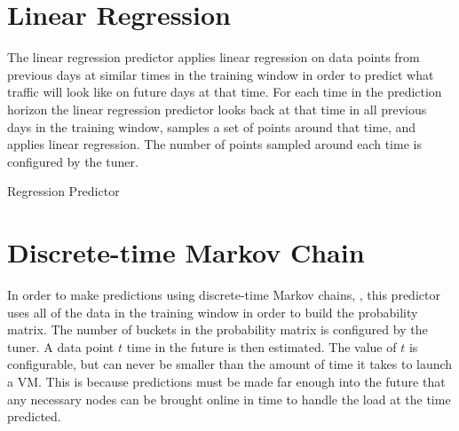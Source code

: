 \section{Linear Regression}
The linear regression predictor applies linear regression on data points from previous days at similar times in the training window in order to predict what traffic will look like on future days at that time. For each time in the prediction horizon the linear regression predictor looks back at that time in all previous days in the training window, samples a set of points around that time, and applies linear regression. The number of points sampled around each time is configured by the \textsf{tuner}.

\begin{algorithm}[H]
\caption{Regression Predictor}
\end{algorithm}

\section{Discrete-time Markov Chain}
In order to make predictions using discrete-time Markov chains, , this predictor uses all of the data in the training window in order to build the probability matrix. The number of buckets in the probability matrix is configured by the \textsf{tuner}. A data point $t$ time in the future is then estimated. The value of $t$ is configurable, but can never be smaller than the amount of time it takes to launch a VM. This is because predictions must be made far enough into the future that any necessary nodes can be brought online in time to handle the load at the time predicted.

